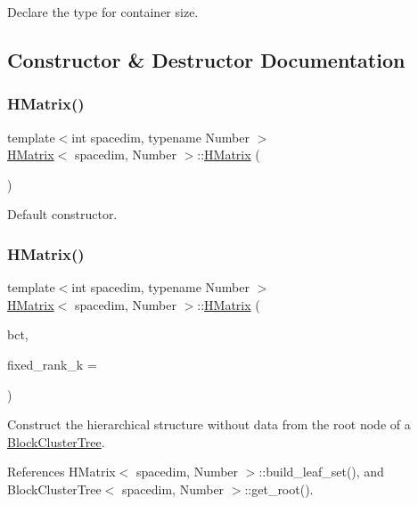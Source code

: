 Declare the type for container size. 

\subsection{Constructor \& Destructor Documentation}
\mbox{\label{classHMatrix_ae3dc35e1aefee2580d27ad2d65c906de}} 
\subsubsection{\texorpdfstring{H\+Matrix()}{HMatrix()}\hspace{0.1cm}{\footnotesize\ttfamily [1/11]}}
{\footnotesize\ttfamily template$<$int spacedim, typename Number $>$ \\
\hyperlink{classHMatrix}{H\+Matrix}$<$ spacedim, Number $>$\+::\hyperlink{classHMatrix}{H\+Matrix} (\begin{DoxyParamCaption}{ }\end{DoxyParamCaption})}

Default constructor. \mbox{\label{classHMatrix_a6a4dead0321e8df38865bf6fbd0f6e81}} 
\subsubsection{\texorpdfstring{H\+Matrix()}{HMatrix()}\hspace{0.1cm}{\footnotesize\ttfamily [2/11]}}
{\footnotesize\ttfamily template$<$int spacedim, typename Number $>$ \\
\hyperlink{classHMatrix}{H\+Matrix}$<$ spacedim, Number $>$\+::\hyperlink{classHMatrix}{H\+Matrix} (\begin{DoxyParamCaption}\item[{const \hyperlink{classBlockClusterTree}{Block\+Cluster\+Tree}$<$ spacedim, Number $>$ \&}]{bct,  }\item[{const unsigned int}]{fixed\+\_\+rank\+\_\+k = {} }\end{DoxyParamCaption})}

Construct the hierarchical structure without data from the root node of a \hyperlink{classBlockClusterTree}{Block\+Cluster\+Tree}. 

References H\+Matrix$<$ spacedim, Number $>$\+::build\+\_\+leaf\+\_\+set(), and Block\+Cluster\+Tree$<$ spacedim, Number $>$\+::get\+\_\+root().

